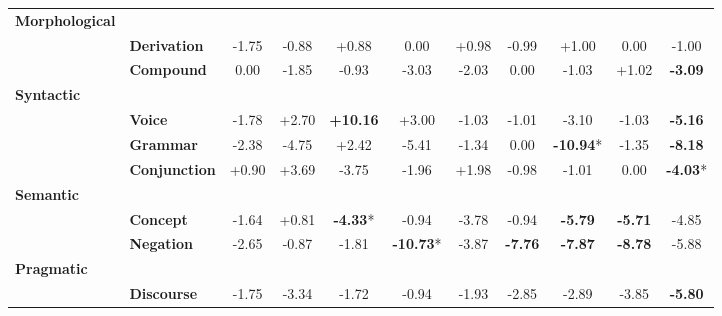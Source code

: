 \begin{table}[h]
\begin{adjustbox}{max width=\linewidth}
\begin{tabular}{llccccccccc}
\textbf{Morphological} & & & & & & & \\
& \textbf{Derivation} & \cellcolor{red!5} -1.75 & \cellcolor{red!2} -0.88 & \cellcolor{green!2} +0.88 & \cellcolor{red!0} 0.00 & \cellcolor{green!2} +0.98 & \cellcolor{red!2} -0.99 & \cellcolor{green!2} +1.00 & \cellcolor{red!0} 0.00 & \cellcolor{red!2} -1.00 \\
& \textbf{Compound} & \cellcolor{red!0} 0.00 & \cellcolor{red!5} -1.85 & \cellcolor{red!2} -0.93 & \cellcolor{red!9} -3.03 & \cellcolor{red!6} -2.03 & \cellcolor{red!0} 0.00 & \cellcolor{red!3} -1.03 & \cellcolor{green!3} +1.02 & \cellcolor{red!9} \textbf{-3.09} \\
\textbf{Syntactic} & & & & & & & \\
& \textbf{Voice} & \cellcolor{red!5} -1.78 & \cellcolor{green!8} +2.70 & \cellcolor{green!30} \textbf{+10.16} & \cellcolor{green!9} +3.00 & \cellcolor{red!3} -1.03 & \cellcolor{red!3} -1.01 & \cellcolor{red!9} -3.10 & \cellcolor{red!3} -1.03 & \cellcolor{red!15} \textbf{-5.16} \\
& \textbf{Grammar} & \cellcolor{red!7} -2.38 & \cellcolor{red!14} -4.75 & \cellcolor{green!7} +2.42 & \cellcolor{red!16} -5.41 & \cellcolor{red!4} -1.34 & \cellcolor{red!0} 0.00 & \cellcolor{red!30} \textbf{-10.94}* & \cellcolor{red!4} -1.35 & \cellcolor{red!24} \textbf{-8.18} \\
& \textbf{Conjunction} & \cellcolor{green!2} +0.90 & \cellcolor{green!11} +3.69 & \cellcolor{red!11} -3.75 & \cellcolor{red!5} -1.96 & \cellcolor{green!5} +1.98 & \cellcolor{red!2} -0.98 & \cellcolor{red!3} -1.01 & \cellcolor{red!0} 0.00 & \cellcolor{red!12} \textbf{-4.03}* \\
\textbf{Semantic} & & & & & & & \\
& \textbf{Concept} & \cellcolor{red!4} -1.64 & \cellcolor{green!2} +0.81 & \cellcolor{red!12} \textbf{-4.33}* & \cellcolor{red!2} -0.94 & \cellcolor{red!11} -3.78 & \cellcolor{red!2} -0.94 & \cellcolor{red!17} \textbf{-5.79} & \cellcolor{red!17} \textbf{-5.71} & \cellcolor{red!14} -4.85 \\
& \textbf{Negation} & \cellcolor{red!7} -2.65 & \cellcolor{red!2} -0.87 & \cellcolor{red!5} -1.81 & \cellcolor{red!30} \textbf{-10.73}* & \cellcolor{red!11} -3.87 & \cellcolor{red!23} \textbf{-7.76} & \cellcolor{red!23} \textbf{-7.87} & \cellcolor{red!26} \textbf{-8.78} & \cellcolor{red!17} -5.88 \\
\textbf{Pragmatic} & & & & & & & \\
& \textbf{Discourse} & \cellcolor{red!5} -1.75 & \cellcolor{red!10} -3.34 & \cellcolor{red!5} -1.72 & \cellcolor{red!2} -0.94 & \cellcolor{red!5} -1.93 & \cellcolor{red!8} -2.85 & \cellcolor{red!8} -2.89 & \cellcolor{red!11} -3.85 & \cellcolor{red!17} \textbf{-5.80} \\

\end{tabular}
\end{adjustbox}
\end{table}
